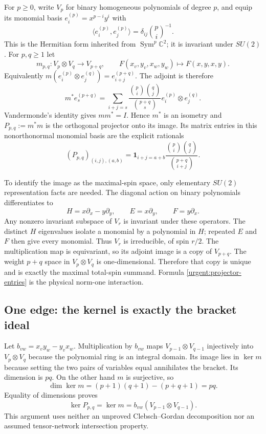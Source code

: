 For $p\geq0$, write $V_p$ for binary homogeneous polynomials of degree
$p$, and equip its monomial basis
$e_i^{(p)}=x^{p-i}y^i$ with
\[
 \langle e_i^{(p)},e_j^{(p)}\rangle
 =\delta_{ij}\binom pi^{-1}.
\]
This is the Hermitian form inherited from $\operatorname{Sym}^p\mathbb C^2$;
it is invariant under $SU(2)$. For $p,q\geq1$ let
\[
 m_{p,q}:V_p\otimes V_q\longrightarrow V_{p+q},
 \qquad F(x_v,y_v,x_w,y_w)\longmapsto F(x,y,x,y).
\]
Equivalently $m(e_i^{(p)}\otimes e_j^{(q)})=e_{i+j}^{(p+q)}$.
The adjoint is therefore
\[
 m^*e_s^{(p+q)}
 =\sum_{i+j=s}\frac{\binom pi\binom qj}{\binom{p+q}s}
 e_i^{(p)}\otimes e_j^{(q)}.
\]
Vandermonde's identity gives $mm^*=I$. Hence $m^*$ is an isometry and
$P_{p,q}:=m^*m$ is the orthogonal projector onto its image. Its matrix
entries in this nonorthonormal monomial basis are the explicit rationals
\begin{equation}
 (P_{p,q})_{(i,j),(a,b)}
 =\mathbf1_{i+j=a+b}
   \frac{\binom pi\binom qj}{\binom{p+q}{i+j}}.
 \label{urgent:projector-entries}
\end{equation}

To identify the image as the maximal-spin space, only elementary
$SU(2)$ representation facts are needed. The diagonal action on binary
polynomials differentiates to
\[
 H=x\partial_x-y\partial_y,\qquad E=x\partial_y,\qquad F=y\partial_x.
\]
Any nonzero invariant subspace of $V_r$ is invariant under these
operators. The distinct $H$ eigenvalues isolate a monomial by a polynomial
in $H$; repeated $E$ and $F$ then give every monomial. Thus $V_r$ is
irreducible, of spin $r/2$. The multiplication map is equivariant, so its
adjoint image is a copy of $V_{p+q}$. The weight $p+q$ space in
$V_p\otimes V_q$ is one-dimensional. Therefore that copy is unique and
is exactly the maximal total-spin summand. Formula
\eqref{urgent:projector-entries} is the physical norm-one interaction.

\subsection{One edge: the kernel is exactly the bracket ideal}

Let $b_{vw}=x_vy_w-y_vx_w$. Multiplication by $b_{vw}$ maps
$V_{p-1}\otimes V_{q-1}$ injectively into $V_p\otimes V_q$ because
the polynomial ring is an integral domain. Its image lies in $\ker m$
because setting the two pairs of variables equal annihilates the bracket.
Its dimension is $pq$. On the other hand $m$ is surjective, so
\[
 \dim\ker m=(p+1)(q+1)-(p+q+1)=pq.
\]
Equality of dimensions proves
\[
 \ker P_{p,q}=\ker m=b_{vw}(V_{p-1}\otimes V_{q-1}).
\]
This argument uses neither an unproved Clebsch--Gordan decomposition nor
an assumed tensor-network intersection property.

